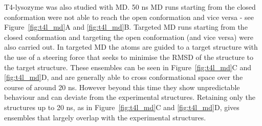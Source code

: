 \begin{figure}


\end{figure}


T4-lysozyme was also studied with MD.
50 ns MD runs starting from the closed conformation were not able to reach the open conformation and vice versa - see Figure~\ref{fig:t4l_md}A and \ref{fig:t4l_md}B.
Targeted MD runs starting from the closed conformation and targeting the open conformation (and vice versa) were also carried out.
In targeted MD the atoms are guided to a target structure with the use of a steering force that seeks to minimise the RMSD of the structure to the target structure.
These ensembles can be seen in Figure~\ref{fig:t4l_md}C and \ref{fig:t4l_md}D, and are generally able to cross conformational space over the course of around 20 ns.
However beyond this time they show unpredictable behaviour and can deviate from the experimental structures.
Retaining only the structures up to 20 ns, as in Figure~\ref{fig:t4l_md}C and \ref{fig:t4l_md}D, gives ensembles that largely overlap with the experimental structures.


